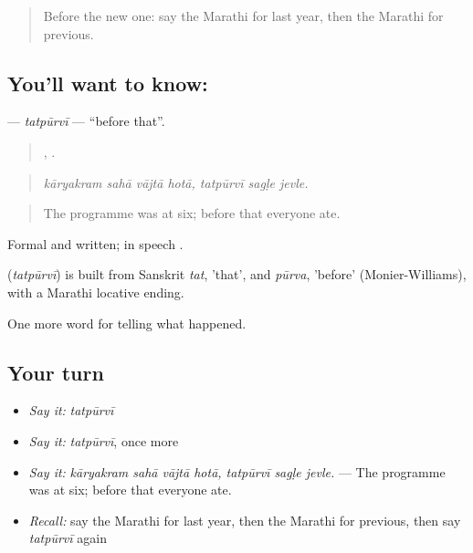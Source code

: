 \label{lesson:MR-C305-tatpurvi}



\begin{quote}
Before the new one: say the Marathi for last year, then the Marathi for previous.
\end{quote}

\subsection*{You'll want to know: }
\textbf{} — \emph{tatpūrvī} — \textquotedblleft{}before that\textquotedblright{}.

\begin{quote}
   ,   .
\end{quote}

\begin{quote}
\emph{kāryakram sahā vājtā hotā, tatpūrvī sagḷe jevle.}
\end{quote}

\begin{quote}
The programme was at six; before that everyone ate.
\end{quote}

Formal and written; in speech  .

\begin{cousinweb}
\textbf{} (\emph{tatpūrvī}) is built from Sanskrit \emph{tat}, 'that', and \emph{pūrva}, 'before' (Monier-Williams), with a Marathi locative ending.
\end{cousinweb}

\begin{grammarlens}[title={What you've built}]
One more word for telling what happened.
\end{grammarlens}

\subsection*{Your turn}
\begin{itemize}
\raggedright
  \item \emph{Say it:} \emph{tatpūrvī}
  \item \emph{Say it:} \emph{tatpūrvī}, once more
  \item \emph{Say it:} \emph{kāryakram sahā vājtā hotā, tatpūrvī sagḷe jevle.} — The programme was at six; before that everyone ate.
  \item \emph{Recall:} say the Marathi for last year, then the Marathi for previous, then say \emph{tatpūrvī} again
\end{itemize}

